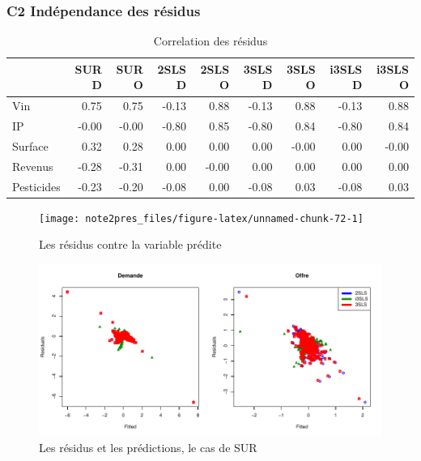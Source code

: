 \documentclass[11pt,]{article}
\begin{document}
\FloatBarrier

\newpage

\hypertarget{c2-independance-des-residus}{%
\subsubsection{C2 Indépendance des
résidus}\label{c2-independance-des-residus}}

\FloatBarrier

\begin{table}[ht]
\centering
\begin{tabular}{l|rrrrrrrr}
  \hline
 & SUR D & SUR O & 2SLS D & 2SLS O & 3SLS D & 3SLS O & i3SLS D & i3SLS O \\ 
  \hline
Vin & 0.75 & 0.75 & -0.13 & 0.88 & -0.13 & 0.88 & -0.13 & 0.88 \\ 
  IP & -0.00 & -0.00 & -0.80 & 0.85 & -0.80 & 0.84 & -0.80 & 0.84 \\ 
  Surface & 0.32 & 0.28 & 0.00 & 0.00 & 0.00 & -0.00 & 0.00 & -0.00 \\ 
  Revenus & -0.28 & -0.31 & 0.00 & -0.00 & 0.00 & 0.00 & 0.00 & 0.00 \\ 
  Pesticides & -0.23 & -0.20 & -0.08 & 0.00 & -0.08 & 0.03 & -0.08 & 0.03 \\ 
   \hline
\end{tabular}
\caption{Correlation des résidus} 
\end{table}

\FloatBarrier

\FloatBarrier

\begin{figure}[!htbp]

{\centering \texttt{[image: note2pres\_files/figure-latex/unnamed-chunk-72-1]} 

}

\caption{Les résidus contre la variable prédite}\label{fig:unnamed-chunk-72}
\end{figure}

\FloatBarrier

\FloatBarrier

\begin{figure}[!htbp]

{\centering \includegraphics{note2pres_files/figure-latex/unnamed-chunk-73-1} 

}

\caption{Les résidus et les prédictions, le cas de SUR}\label{fig:unnamed-chunk-73}
\end{figure}
\end{document}

